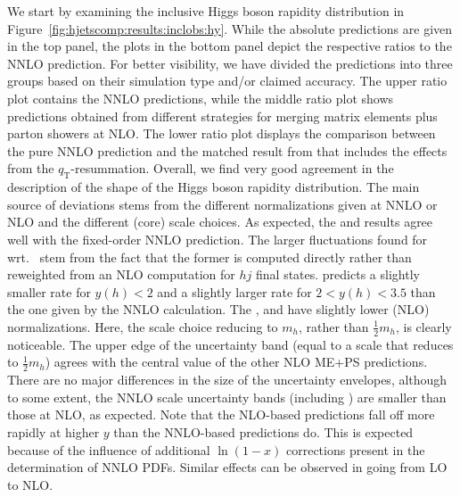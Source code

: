 We start by examining the inclusive Higgs boson rapidity distribution in
Figure~\ref{fig:hjetscomp:results:inclobs:hy}. While the absolute
predictions are given in the top panel, the plots in the bottom panel
depict the respective ratios to the NNLO prediction. For better
visibility, we have divided the predictions into three groups based on
their simulation type and/or claimed accuracy. The upper ratio plot
contains the NNLO predictions, while the middle ratio plot shows predictions obtained
from different strategies for  merging matrix elements plus parton showers
at NLO. The lower ratio plot displays the comparison between the pure
NNLO prediction and the matched result from \Resbos that includes the
effects from the $q_\text{T}$-resummation. Overall, we find very good
agreement in the description of the shape of the Higgs boson rapidity
distribution. The main source of deviations stems from the different
normalizations given at NNLO or NLO and the different (core) scale
choices. As expected, the \Sherpa \NNLOPS and
\Powheg \NNLOPS results agree well with the fixed-order NNLO prediction. 
The larger fluctuations found for \Sherpa \NNLOPS wrt.~\Powheg \NNLOPS
stem from the fact that the former is computed directly rather than
reweighted from an NLO computation for $hj$ final states.
\Resbos predicts a slightly smaller rate for $y(h)<2$ and a
slightly larger rate for $2<y(h)<3.5$ than the one given by the NNLO
calculation. The \MGaMC, \Sherpa \MEPSatNLO and \Herwig have slightly
lower (NLO) normalizations. Here, the \MGaMC scale choice reducing to
$m_h$, rather than $\tfrac{1}{2}m_h$, is clearly noticeable. The upper edge of
the \MGaMC uncertainty band (equal to a scale that reduces to $\tfrac{1}{2}m_h$)
agrees with the central value of the other NLO ME+PS
predictions. There are no major differences in the size of the
uncertainty envelopes, although to some extent, the NNLO scale
uncertainty bands (including \Resbos) are smaller than those at NLO,
as expected. Note
that the NLO-based predictions fall off more rapidly at higher $y$
than the NNLO-based predictions do. This is expected because of the
influence of additional $\ln(1-x)$ corrections present in the
determination of NNLO PDFs. Similar effects can be observed in going
from LO to NLO.

